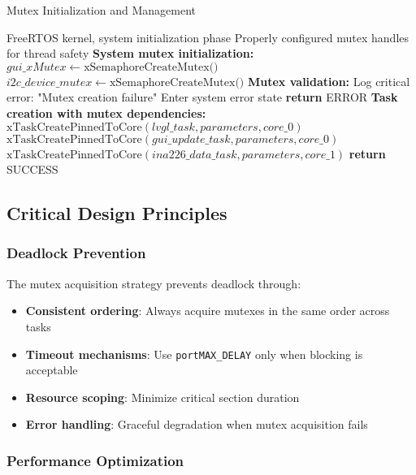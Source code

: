 \documentclass{article}
\begin{document}
\begin{algorithm}
\caption{Mutex Initialization and Management}
\label{alg:mutex_initialization}
\begin{algorithmic}[1]
\REQUIRE FreeRTOS kernel, system initialization phase
\ENSURE Properly configured mutex handles for thread safety
\STATE \textbf{System mutex initialization:}
\STATE $gui\_xMutex \leftarrow \text{xSemaphoreCreateMutex()}$
\STATE $i2c\_device\_mutex \leftarrow \text{xSemaphoreCreateMutex()}$
\STATE
\STATE \textbf{Mutex validation:}
    \STATE Log critical error: "Mutex creation failure"
    \STATE Enter system error state
    \STATE \textbf{return} ERROR
\ENDIF
\STATE
\STATE \textbf{Task creation with mutex dependencies:}
\STATE $\text{xTaskCreatePinnedToCore}(lvgl\_task, parameters, core\_0)$
\STATE $\text{xTaskCreatePinnedToCore}(gui\_update\_task, parameters, core\_0)$
\STATE $\text{xTaskCreatePinnedToCore}(ina226\_data\_task, parameters, core\_1)$
\STATE
\STATE \textbf{return} SUCCESS
\end{algorithmic}
\end{algorithm}

\subsection{Critical Design Principles}

\subsubsection{Deadlock Prevention}

The mutex acquisition strategy prevents deadlock through:

\begin{itemize}
    \item \textbf{Consistent ordering}: Always acquire mutexes in the same order across tasks
    \item \textbf{Timeout mechanisms}: Use \texttt{portMAX\_DELAY} only when blocking is acceptable
    \item \textbf{Resource scoping}: Minimize critical section duration
    \item \textbf{Error handling}: Graceful degradation when mutex acquisition fails
\end{itemize}

\subsubsection{Performance Optimization}
\end{document}
